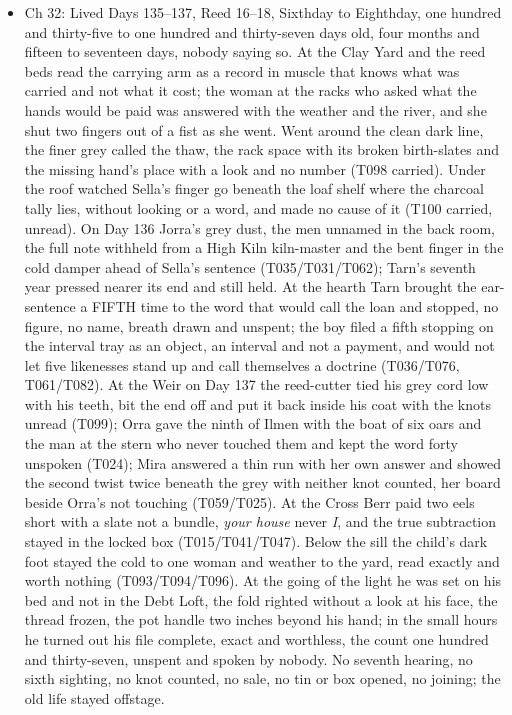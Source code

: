 \documentclass{design/chronicle}
\begin{document}
{\begin{itemize}[leftmargin=1.4em,itemsep=1pt,topsep=3pt,parsep=0pt]
\item Ch 32: Lived Days 135–137, Reed 16–18, Sixthday to Eighthday, one hundred and thirty-five to one hundred and thirty-seven days old, four months and fifteen to seventeen days, nobody saying so. At the Clay Yard and the reed beds read the carrying arm as a record in muscle that knows what was carried and not what it cost; the woman at the racks who asked what the hands would be paid was answered with the weather and the river, and she shut two fingers out of a fist as she went. Went around the clean dark line, the finer grey called the thaw, the rack space with its broken birth-slates and the missing hand’s place with a look and no number (T098 carried). Under the roof watched Sella’s finger go beneath the loaf shelf where the charcoal tally lies, without looking or a word, and made no cause of it (T100 carried, unread). On Day 136 Jorra’s grey dust, the men unnamed in the back room, the full note withheld from a High Kiln kiln-master and the bent finger in the cold damper ahead of Sella’s sentence (T035/T031/T062); Tarn’s seventh year pressed nearer its end and still held. At the hearth Tarn brought the ear-sentence a FIFTH time to the word that would call the loan and stopped, no figure, no name, breath drawn and unspent; the boy filed a fifth stopping on the interval tray as an object, an interval and not a payment, and would not let five likenesses stand up and call themselves a doctrine (T036/T076, T061/T082). At the Weir on Day 137 the reed-cutter tied his grey cord low with his teeth, bit the end off and put it back inside his coat with the knots unread (T099); Orra gave the ninth of Ilmen with the boat of six oars and the man at the stern who never touched them and kept the word forty unspoken (T024); Mira answered a thin run with her own answer and showed the second twist twice beneath the grey with neither knot counted, her board beside Orra’s not touching (T059/T025). At the Cross Berr paid two eels short with a slate not a bundle, \emph{your house} never \emph{I}, and the true subtraction stayed in the locked box (T015/T041/T047). Below the sill the child’s dark foot stayed the cold to one woman and weather to the yard, read exactly and worth nothing (T093/T094/T096). At the going of the light he was set on his bed and not in the Debt Loft, the fold righted without a look at his face, the thread frozen, the pot handle two inches beyond his hand; in the small hours he turned out his file complete, exact and worthless, the count one hundred and thirty-seven, unspent and spoken by nobody. No seventh hearing, no sixth sighting, no knot counted, no sale, no tin or box opened, no joining; the old life stayed offstage.


\end{itemize}}
\end{document}
